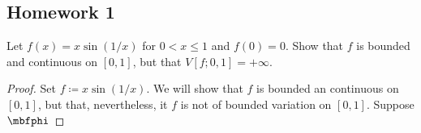 \subsection{Homework 1}
\begin{problem}
Let $f(x)=x\sin(1/x)$ for $0<x\leq 1$ and $f(0)=0$. Show that $f$ is
bounded and continuous on $[0,1]$, but that $V[f;0,1]=+\infty$.
\end{problem}
\begin{proof}
Set $f\coloneqq x\sin(1/x)$. We will show that $f$ is bounded an continuous
on $[0,1]$, but that, nevertheless, it $f$ is not of bounded variation on
$[0,1]$. Suppose $\bfphi$


\end{proof}

